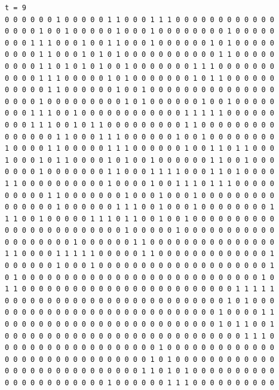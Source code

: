 \documentclass[a4paper,12pt]{article}
\begin{document}
\begin{verbatim}
t = 9
0 0 0 0 0 0 1 0 0 0 0 0 1 1 0 0 0 1 1 1 0 0 0 0 0 0 0 0 0 0 0 0 
0 0 0 0 1 0 0 1 0 0 0 0 0 1 0 0 0 1 0 0 0 0 0 0 0 0 1 0 0 0 0 0 
0 0 0 1 1 1 0 0 0 1 0 0 1 1 0 0 0 1 0 0 0 0 0 0 1 0 1 0 0 0 0 0 
0 0 0 0 1 1 0 0 0 1 0 1 0 1 0 0 0 0 0 0 0 0 0 0 0 1 1 0 0 0 0 0 
0 0 0 0 1 1 0 1 0 1 0 1 0 0 1 0 0 0 0 0 0 0 1 1 1 0 0 0 0 0 0 0 
0 0 0 0 1 1 1 0 0 0 0 0 1 0 1 0 0 0 0 0 0 0 1 0 1 1 0 0 0 0 0 0 
0 0 0 0 0 1 1 0 0 0 0 0 0 1 0 0 1 0 0 0 0 0 0 0 0 0 0 0 0 0 0 0 
0 0 0 0 1 0 0 0 0 0 0 0 0 0 1 0 1 0 0 0 0 0 0 1 0 0 1 0 0 0 0 0 
0 0 0 1 1 1 0 0 1 0 0 0 0 0 0 0 0 0 0 0 0 1 1 1 1 1 0 0 0 0 0 0 
0 0 0 1 1 1 0 0 1 0 1 1 0 0 0 0 0 0 0 0 0 1 1 0 0 0 0 0 0 0 0 0 
0 0 0 0 0 0 1 1 0 0 0 1 1 1 0 0 0 0 0 0 1 0 0 1 0 0 0 0 0 0 0 0 
1 0 0 0 0 1 1 0 0 0 0 0 1 1 1 0 0 0 0 0 0 1 0 0 1 1 0 1 1 0 0 0 
1 0 0 0 1 0 1 1 0 0 0 0 1 0 1 0 0 1 0 0 0 0 0 0 1 1 0 0 1 0 0 0 
0 0 0 0 1 0 0 0 0 0 0 0 1 1 0 0 0 1 1 1 1 0 0 0 1 1 0 1 0 0 0 0 
1 1 0 0 0 0 0 0 0 0 0 0 1 0 0 0 0 1 0 0 1 1 1 0 1 1 1 0 0 0 0 0 
0 0 0 0 0 1 1 0 0 0 0 0 0 0 1 0 0 0 1 0 0 0 1 0 0 0 0 0 0 0 0 0 
0 0 0 0 0 0 1 0 0 0 0 0 0 1 1 1 0 0 1 0 0 0 1 0 0 0 0 0 0 0 0 1 
1 1 0 0 1 0 0 0 0 0 1 1 1 0 1 1 0 0 1 0 0 1 0 0 0 0 0 0 0 0 0 0 
0 0 0 0 0 0 0 0 0 0 0 0 0 0 1 0 0 0 0 0 1 0 0 0 0 0 0 0 0 0 0 0 
0 0 0 0 0 0 0 0 1 0 0 0 0 0 0 1 1 0 0 0 0 0 0 0 0 0 0 0 0 0 0 0 
1 1 0 0 0 0 1 1 1 1 1 0 0 0 0 0 1 1 0 0 0 0 0 0 0 0 0 0 0 0 0 1 
0 0 0 0 0 0 1 0 0 0 1 0 0 0 0 0 0 0 0 0 0 0 0 0 0 0 0 0 0 0 0 1 
0 1 0 0 0 0 0 0 0 0 0 0 0 0 0 0 0 0 0 0 0 0 0 0 0 0 0 0 0 0 1 0 
1 1 0 0 0 0 0 0 0 0 0 0 0 0 0 0 0 0 0 0 0 0 0 0 0 0 0 1 1 1 1 1 
0 0 0 0 0 0 0 0 0 0 0 0 0 0 0 0 0 0 0 0 0 0 0 0 0 0 1 0 1 0 0 0 
0 0 0 0 0 0 0 0 0 0 0 0 0 0 0 0 0 0 0 0 0 0 0 0 0 1 0 0 0 0 1 1 
0 0 0 0 0 0 0 0 0 0 0 0 0 0 0 0 0 0 0 0 0 0 0 0 0 1 0 1 1 0 0 1 
0 0 0 0 0 0 0 0 0 0 0 0 0 0 0 0 0 0 0 0 0 0 0 0 0 0 0 0 1 1 1 0 
0 0 0 0 0 0 0 0 0 0 0 0 0 0 0 0 0 0 1 0 0 0 0 0 0 0 0 0 0 0 0 0 
0 0 0 0 0 0 0 0 0 0 0 0 0 0 0 0 0 1 0 1 0 0 0 0 0 0 0 0 0 0 0 0 
0 0 0 0 0 0 0 0 0 0 0 0 0 0 0 0 1 1 0 1 0 1 0 0 0 0 0 0 0 0 0 0 
0 0 0 0 0 0 0 0 0 0 0 0 1 0 0 0 0 0 0 1 1 1 0 0 0 0 0 0 0 0 0 0 




\end{verbatim}
\end{document}
